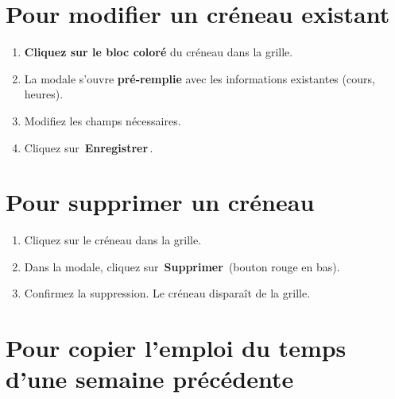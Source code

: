 \documentclass[12pt,a4paper]{report}
\newcommand{\bouton}[1]{{\colorbox{emerald}{\small\sffamily\bfseries\color{white}\,#1\,}}}
\newcommand{\btnrose}[1]{{\colorbox{rose}{\small\sffamily\bfseries\color{white}\,#1\,}}}
\begin{document}
\section{Pour modifier un cr\'eneau existant}

\begin{etape}[title=Proc\'edure : Modifier un cr\'eneau]
\begin{enumerate}[leftmargin=1.5cm,label=\textbf{\arabic*.},itemsep=8pt]
  \item \textbf{Cliquez sur le bloc color\'e} du cr\'eneau dans la grille.
  \item La modale s'ouvre \textbf{pr\'e-remplie} avec les informations existantes (cours, heures).
  \item Modifiez les champs n\'ecessaires.
  \item Cliquez sur \bouton{Enregistrer}.
\end{enumerate}
\end{etape}

\section{Pour supprimer un cr\'eneau}

\begin{etape}[title=Proc\'edure : Supprimer un cr\'eneau]
\begin{enumerate}[leftmargin=1.5cm,label=\textbf{\arabic*.},itemsep=8pt]
  \item Cliquez sur le cr\'eneau dans la grille.
  \item Dans la modale, cliquez sur \btnrose{Supprimer} (bouton rouge en bas).
  \item Confirmez la suppression. Le cr\'eneau dispara\^it de la grille.
\end{enumerate}
\end{etape}

\section{Pour copier l'emploi du temps d'une semaine pr\'ec\'edente}
\end{document}
